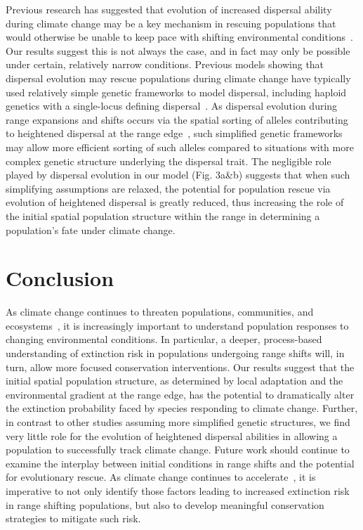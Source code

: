 \documentclass[11pt]{article}
\begin{document}
Previous research has suggested that evolution of increased dispersal ability during climate change may be a key mechanism in rescuing populations that would otherwise be unable to keep pace with shifting environmental conditions~\citep{boeye2013more}. Our results suggest this is not always the case, and in fact may only be possible under certain, relatively narrow conditions. Previous models showing that dispersal evolution may rescue populations during climate change have typically used relatively simple genetic frameworks to model dispersal, including haploid genetics with a single-locus defining dispersal~\citep{boeye2013more, hargreaves2015fitness}. As dispersal evolution during range expansions and shifts occurs via the spatial sorting of alleles contributing to heightened dispersal at the range edge~\citep{shine2011evolutionary}, such simplified genetic frameworks may allow more efficient sorting of such alleles compared to situations with more complex genetic structure underlying the dispersal trait. The negligible role played by dispersal evolution in our model (Fig. 3a\&b) suggests that when such simplifying assumptions are relaxed, the potential for population rescue via evolution of heightened dispersal is greatly reduced, thus increasing the role of the initial spatial population structure within the range in determining a population's fate under climate change.

\section*{Conclusion}
As climate change continues to threaten populations, communities, and ecosystems~\citep{chen2011rapid, hobbs2009novel, gonzalez2010global}, it is increasingly important to understand population responses to changing environmental conditions. In particular, a deeper, process-based understanding of extinction risk in populations undergoing range shifts will, in turn, allow more focused conservation interventions. Our results suggest that the initial spatial population structure, as determined by local adaptation and the environmental gradient at the range edge, has the potential to dramatically alter the extinction probability faced by species responding to climate change. Further, in contrast to other studies assuming more simplified genetic structures, we find very little role for the evolution of heightened dispersal abilities in allowing a population to successfully track climate change. Future work should continue to examine the interplay between initial conditions in range shifts and the potential for evolutionary rescue. As climate change continues to accelerate~\citep{chen2017increasing}, it is imperative to not only identify those factors leading to increased extinction risk in range shifting populations, but also to develop meaningful conservation strategies to mitigate such risk.
\end{document}
